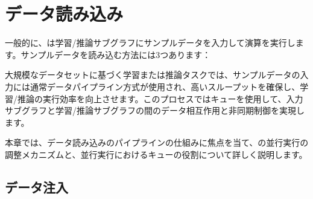 \begin{savequote}[45mm]
\end{savequote}

\chapter{データ読み込み} 
\label{ch:input-pipeline}

\begin{content}

一般的に、は学習/推論サブグラフにサンプルデータを入力して演算を実行します。サンプルデータを読み込む方法には3つあります：

\begin{enum}
\end{enum}

大規模なデータセットに基づく学習または推論タスクでは、サンプルデータの入力には通常データパイプライン方式が使用され、高いスループットを確保し、学習/推論の実行効率を向上させます。このプロセスではキューを使用して、入力サブグラフと学習/推論サブグラフの間のデータ相互作用と非同期制御を実現します。

本章では、データ読み込みのパイプラインの仕組みに焦点を当て、の並行実行の調整メカニズムと、並行実行におけるキューの役割について詳しく説明します。

\end{content}

\section{データ注入}

